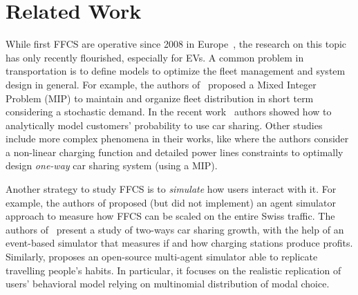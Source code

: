 \section{Related Work}
\label{sec:10_2_related_work}

While first FFCS are operative since 2008 in Europe~\cite{Kortum2016}, the research on this topic has only recently flourished, especially for EVs.
A common problem in transportation is to define models to optimize the fleet management and system design in general. For example, the authors of~\cite{11_nair2011fleet} proposed a Mixed Integer Problem (MIP) to maintain and organize fleet distribution in short term considering a stochastic demand. In the recent work~\cite{5_he2017service} authors showed how to analytically model customers' probability to use car sharing. %
Other studies include more complex phenomena in their works, like \cite{16_xu2019fleet} where the authors consider a non-linear charging function and detailed power lines constraints to optimally design \emph{one-way} car sharing system (using a MIP). %

Another strategy to study FFCS is to \emph{simulate} how users interact with it. For example, the authors of \cite{13_ciari2008concepts} proposed (but did not implement) an agent simulator approach to measure how FFCS can be scaled on the entire Swiss traffic. 
The authors of~\cite{12_martin2011greenhouse} present a study of two-ways car sharing growth, with the help of an event-based simulator that measures if and how charging stations produce profits. 
Similarly, \cite{24_ciari2016modeling} proposes an open-source multi-agent simulator able to replicate travelling people's habits. In particular, it focuses on the realistic replication of users' behavioral model relying on multinomial distribution of modal choice.

